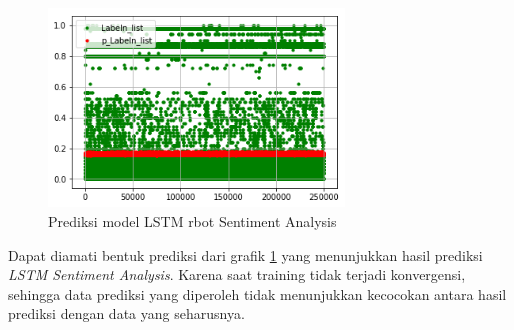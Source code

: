 \documentclass[./skripsi.tex]{subfiles}
\begin{document}
\begin{figure}%
    \centering
    \includegraphics[width=0.7\textwidth]{public/assets/img/lstms_rbot_pred.png}
    \caption{Prediksi model LSTM rbot Sentiment Analysis}
    \label{fig:lstms_rbot_pred}
\end{figure}

\par Dapat diamati bentuk prediksi dari grafik \ref{fig:lstms_rbot_pred} yang menunjukkan hasil prediksi \textit{LSTM Sentiment Analysis}. Karena saat training tidak terjadi konvergensi, sehingga data prediksi yang diperoleh tidak menunjukkan kecocokan antara hasil prediksi dengan data yang seharusnya.

\end{document}
